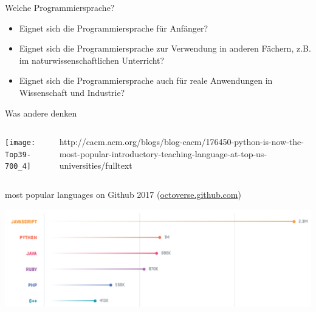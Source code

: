 \documentclass[t, utf8, 10pt]{beamer}
\begin{document}
\begin{frame}{Welche Programmiersprache?}

 \vspace{1truecm}
 \begin{itemize}
  \item Eignet sich die Programmiersprache für Anfänger?
  \item Eignet sich die Programmiersprache zur Verwendung
        in anderen Fächern, z.B. im naturwissenschaftlichen
        Unterricht?
  \item Eignet sich die Programmiersprache auch für reale
        Anwendungen in Wissenschaft und Industrie?
 \end{itemize}
\end{frame}

\begin{frame}{Was andere denken}
 \begin{columns}
  \begin{column}{0.58\textwidth}
   \texttt{[image: Top39-700\_4]}
  \end{column}
  \begin{column}{0.42\textwidth}
   \vspace{-2truecm}

   \fontsize{5}{6}\selectfont
   http://cacm.acm.org/blogs/blog-cacm/176450-python-is-now-the-most-popular-introductory-teaching-language-at-top-us-universities/fulltext
  \end{column}
 \end{columns}

 \vspace{\baselineskip}
 most popular languages on Github 2017 (\url{octoverse.github.com})

 \includegraphics[width=\textwidth]{Screenshot-2018-4-12_GitHub_Octoverse_2017}
\end{frame}
\end{document}
